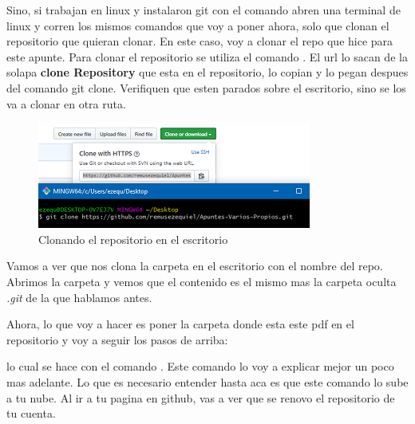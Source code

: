 \documentclass[10pt,journal,compsoc]{IEEEtran}
\begin{document}
Sino, si trabajan en linux y instalaron git con el comando \textit{\color{Green}{sudo apt-get install git}} abren una terminal de linux y corren los mismos comandos que voy a poner ahora, solo que clonan el repositorio que quieran clonar. En este caso, voy a clonar el repo que hice para este apunte. Para clonar el repositorio se utiliza el comando \textit{\color{Blue}{git clone urlDelRepositorio}}. El url lo sacan de la solapa \textbf{clone Repository} que esta en el repositorio, lo copian y lo pegan despues del comando git clone. Verifiquen que esten parados sobre el escritorio, sino se los va a clonar en otra ruta.

\begin{figure}[H]
  \begin{center}
	 \includegraphics{figuras/clone.png}
	 \centering
	 \renewcommand{\arraystretch}{1.3}
	 \caption{Clonando el repositorio en el escritorio}
  \end{center}
\end{figure}

Vamos a ver que nos clona la carpeta en el escritorio con el nombre del repo. Abrimos la carpeta y vemos que el contenido es el mismo mas la carpeta oculta \textit{.git} de la que hablamos antes.


Ahora, lo que voy a hacer es poner la carpeta donde esta este pdf en el repositorio y voy a seguir los pasos de arriba:


 
 
 lo cual se hace con el comando \textit{\color{Blue}{git push origin master}}. Este comando lo voy a explicar mejor un poco mas adelante. Lo que es necesario entender hasta aca es que este comando lo sube a tu nube. Al ir a tu pagina en github, vas a ver que se renovo el repositorio de tu cuenta.
\\
\\
\\
\end{document}
